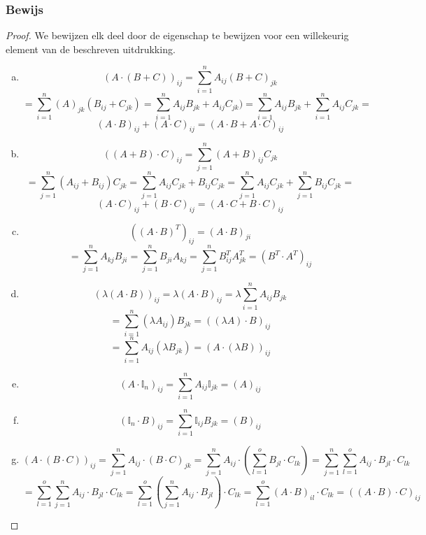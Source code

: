 \documentclass[lineaire_algebra_oplossingen.tex]{subfiles}
\begin{document}
\subsubsection*{Bewijs}
\begin{proof}
We bewijzen elk deel door de eigenschap te bewijzen voor een willekeurig element van de beschreven uitdrukking.
\begin{enumerate}[(a)]
\item 
\[ (A\cdot (B+C))_{ij} = \sum_{i=1}^nA_{ij}(B+C)_{jk}\]
\[ = \sum_{i=1}^n(A)_{jk}(B_{ij}+C_{jk}) = \sum_{i=1}^n A_{ij}B_{jk}+A_{ij}C_{jk}) = \sum_{i=1}^nA_{ij}B_{jk} + \sum_{i=1}^nA_{ij}C_{jk} = \]
\[ (A\cdot B)_{ij} + (A \cdot C)_{ij} = (A\cdot B + A \cdot C)_{ij}\]

\item 
\[ ((A+B) \cdot C)_{ij} = \sum_{j=1}^n(A+B)_{ij}C_{jk}\]
\[ = \sum_{j=1}^n(A_{ij}+B_{ij})C_{jk} = \sum_{j=1}^n A_{ij}C_{jk}+B_{ij}C_{jk} = \sum_{j=1}^nA_{ij}C_{jk} + \sum_{j=1}^nB_{ij}C_{jk} = \]
\[ (A\cdot C)_{ij} + (B \cdot C)_{ij} = (A\cdot C + B \cdot C)_{ij} \]

\item 
\[ ((A\cdot B)^T)_{ij}  = (A\cdot B)_{ji}\]
\[ = \sum_{j=1}^nA_{kj}B_{ji} = \sum_{j=1}^nB_{ji}A_{kj} = \sum_{j=1}^nB^T_{ij}A^T_{jk} = (B^T \cdot A^T)_{ij} \]

\item 
\[ (\lambda(A\cdot B))_{ij} = \lambda(A\cdot B)_{ij} = \lambda\sum_{i=1}^nA_{ij}B_{jk}\]
\[ = \sum_{i=1}^n(\lambda A_{ij})B_{jk} = ((\lambda A)\cdot B)_{ij} \]
\[ = \sum_{i=1}^nA_{ij}(\lambda B_{jk}) = (A \cdot (\lambda B))_{ij}\]

\item 
\[ (A \cdot \mathbb{I}_{n})_{ij} = \sum_{i=1}^nA_{ij}\mathbb{I}_{jk} = (A)_{ij} \]

\item 
\[ (\mathbb{I}_{n} \cdot B)_{ij} =  \sum_{i=1}^n\mathbb{I}_{ij}B_{jk} =  (B)_{ij} \]

\item
\[
(A\cdot (B\cdot C))_{ij}
= \sum_{j=1}^n A_{ij}\cdot (B\cdot C)_{jk}
= \sum_{j=1}^n A_{ij}\cdot \left( \sum_{l=1}^o B_{jl}\cdot C_{lk} \right)
= \sum_{j=1}^n \sum_{l=1}^o A_{ij}\cdot B_{jl}\cdot C_{lk}
\]
\[
= \sum_{l=1}^o \sum_{j=1}^n  A_{ij}\cdot B_{jl}\cdot C_{lk}
= \sum_{l=1}^o \left(\sum_{j=1}^n  A_{ij}\cdot B_{jl}\right)\cdot C_{lk}
= \sum_{l=1}^o (A\cdot B)_{il} \cdot C_{lk}
= ((A\cdot B) \cdot C)_{ij}
\]

\end{enumerate}
\end{proof}
\end{document}
